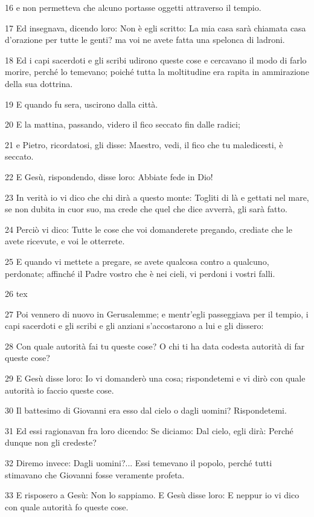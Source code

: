 \par 16 e non permetteva che alcuno portasse oggetti attraverso il tempio.
\par 17 Ed insegnava, dicendo loro: Non è egli scritto: La mia casa sarà chiamata casa d'orazione per tutte le genti? ma voi ne avete fatta una spelonca di ladroni.
\par 18 Ed i capi sacerdoti e gli scribi udirono queste cose e cercavano il modo di farlo morire, perché lo temevano; poiché tutta la moltitudine era rapita in ammirazione della sua dottrina.
\par 19 E quando fu sera, uscirono dalla città.
\par 20 E la mattina, passando, videro il fico seccato fin dalle radici;
\par 21 e Pietro, ricordatosi, gli disse: Maestro, vedi, il fico che tu maledicesti, è seccato.
\par 22 E Gesù, rispondendo, disse loro: Abbiate fede in Dio!
\par 23 In verità io vi dico che chi dirà a questo monte: Togliti di là e gettati nel mare, se non dubita in cuor suo, ma crede che quel che dice avverrà, gli sarà fatto.
\par 24 Perciò vi dico: Tutte le cose che voi domanderete pregando, crediate che le avete ricevute, e voi le otterrete.
\par 25 E quando vi mettete a pregare, se avete qualcosa contro a qualcuno, perdonate; affinché il Padre vostro che è nei cieli, vi perdoni i vostri falli.
\par 26 tex
\par 27 Poi vennero di nuovo in Gerusalemme; e mentr'egli passeggiava per il tempio, i capi sacerdoti e gli scribi e gli anziani s'accostarono a lui e gli dissero:
\par 28 Con quale autorità fai tu queste cose? O chi ti ha data codesta autorità di far queste cose?
\par 29 E Gesù disse loro: Io vi domanderò una cosa; rispondetemi e vi dirò con quale autorità io faccio queste cose.
\par 30 Il battesimo di Giovanni era esso dal cielo o dagli uomini? Rispondetemi.
\par 31 Ed essi ragionavan fra loro dicendo: Se diciamo: Dal cielo, egli dirà: Perché dunque non gli credeste?
\par 32 Diremo invece: Dagli uomini?... Essi temevano il popolo, perché tutti stimavano che Giovanni fosse veramente profeta.
\par 33 E risposero a Gesù: Non lo sappiamo. E Gesù disse loro: E neppur io vi dico con quale autorità fo queste cose.

